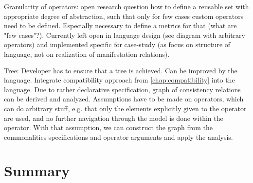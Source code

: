 Granularity of operators: open research question how to define a reusable set with appropriate degree of abstraction, such that only for few cases custom operators need to be defined. Especially necessary to define a metrics for that (what are "few cases"?). Currently left open in language design (see diagram with arbitrary operators) and implemented specific for case-study (as focus on structure of language, not on realization of manifestation relations).

Tree: Developer has to ensure that a tree is achieved. Can be improved by the language. Integrate compatibility approach from \autoref{chap:compatibility} into the language. Due to rather declarative specification, graph of consistency relations can be derived and analyzed. Assumptions have to be made on operators, which can do arbitrary stuff, e.g. that only the elements explicitly given to the operator are used, and no further navigation through the model is done within the operator. With that assumption, we can construct the graph from the commonalities specifications and operator arguments and apply the analysis.


\section{Summary}



